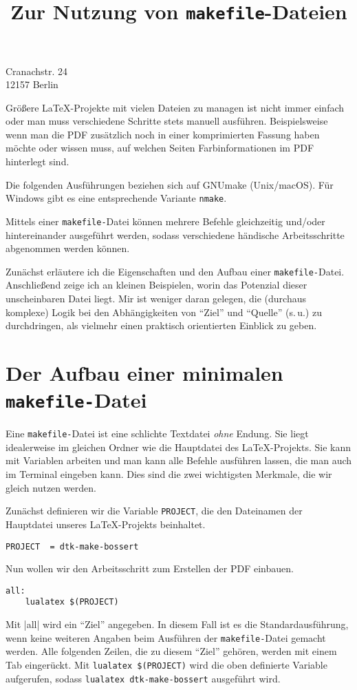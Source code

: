 \documentclass[ngerman]{dtk}
\begin{document}
\title{Zur Nutzung von \texttt{makefile}-Dateien}
%
{Cranachstr. 24\\
12157 Berlin\\
}
\maketitle

Größere \LaTeX -Projekte mit vielen Dateien zu managen ist nicht immer einfach
oder man muss verschiedene Schritte stets manuell ausführen.
Beispielsweise wenn man die PDF zusätzlich noch in einer komprimierten
Fassung haben möchte oder wissen muss, auf welchen Seiten Farbinformationen im PDF
hinterlegt sind.

Die folgenden Ausführungen beziehen sich auf GNUmake (Unix/macOS).
Für Windows gibt es eine entsprechende Variante \texttt{nmake}.


Mittels einer \texttt{makefile-}Datei können mehrere Befehle gleichzeitig und/oder
hintereinander ausgeführt werden, sodass verschiedene händische Arbeitsschritte abgenommen werden können.

Zunächst erläutere ich die Eigenschaften und den Aufbau einer \texttt{makefile-}Datei.
Anschließend zeige ich an kleinen Beispielen,
worin das Potenzial dieser unscheinbaren Datei liegt.
Mir ist weniger daran gelegen,
die (durchaus komplexe) Logik bei den Abhängigkeiten von \enquote{Ziel}
und \enquote{Quelle} (s.\,u.) zu durchdringen,
als vielmehr einen praktisch orientierten Einblick zu geben.

\section{Der Aufbau einer minimalen \texttt{makefile-}Datei}
Eine \texttt{makefile-}Datei ist eine schlichte Textdatei \emph{ohne} Endung.
Sie liegt idealerweise im gleichen Ordner wie die Hauptdatei des \LaTeX -Projekts.
Sie kann mit Variablen arbeiten und man kann alle Befehle ausführen lassen,
die man auch im Terminal eingeben kann.
Dies sind die zwei wichtigsten Merkmale,
die wir gleich nutzen werden.

Zunächst definieren wir die Variable \texttt{PROJECT},
die den Dateinamen der Hauptdatei unseres \LaTeX -Projekts beinhaltet.
\begin{lstlisting}[style=number]
PROJECT  = dtk-make-bossert
\end{lstlisting}

Nun wollen wir den Arbeitsschritt zum Erstellen der PDF einbauen.
\begin{lstlisting}[style=number]
all:
    lualatex $(PROJECT)
\end{lstlisting}
Mit |all| wird ein \enquote{Ziel} angegeben.
In diesem Fall ist es die Standardausführung,
wenn keine weiteren Angaben beim Ausführen der
\texttt{makefile-}Datei gemacht werden.
Alle folgenden Zeilen, die zu diesem \enquote{Ziel} gehören,
werden mit einem Tab eingerückt.
Mit \texttt{lualatex \$(PROJECT)} wird die oben definierte
Variable aufgerufen, sodass \texttt{lualatex dtk-make-bossert}
ausgeführt wird.
\end{document}
